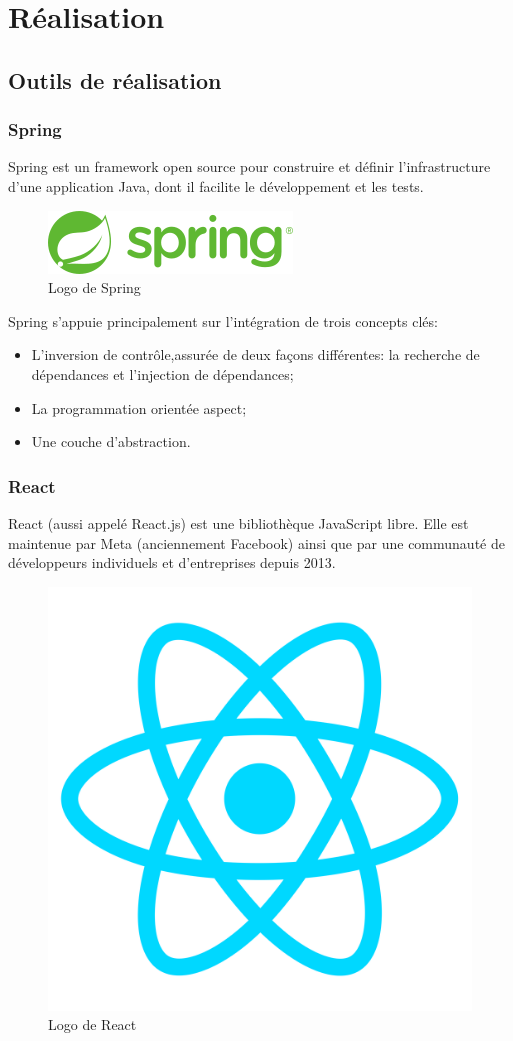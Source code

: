 \chapter{Réalisation}

\clearpage

\section{Outils de réalisation}



\subsection{Spring}
\noindent Spring est un framework open source pour construire et définir l'infrastructure d'une application Java, dont il facilite le développement et les tests. \\

\begin{figure}[H]
    \centering
    \includegraphics[width=.4\textwidth]{logos/spring.png}
    \caption{Logo de Spring}
\end{figure}



\noindent Spring s'appuie principalement sur l'intégration de trois concepts clés:

\begin{itemize}
    \item L'inversion de contrôle,assurée de deux façons différentes: la recherche de dépendances et l'injection de dépendances;
    \item La programmation orientée aspect;
    \item Une couche d'abstraction.
\end{itemize}


\subsection{React}

\noindent React (aussi appelé React.js) est une bibliothèque JavaScript libre. Elle est maintenue par Meta (anciennement Facebook) ainsi que par une communauté de développeurs individuels et d'entreprises depuis 2013.

\begin{figure}[H]
    \centering
    \includegraphics[width=.25\textwidth]{logos/react.png}
    \caption{Logo de React}
\end{figure}

